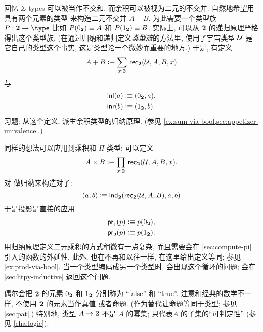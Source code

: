 回忆 $\Sigma$-types 可以被当作不交和, 而余积可以被视为二元的不交并.
自然地希望用具有两个元素的类型 \bool 来构造二元不交并 $A+B$.
为此需要一个类型族 $P:\bool\to\type$ 比如 $P({0_{\mathbf{2}}})\equiv A$ 和 $P({1_{\mathbf{2}}})\equiv B$.
实际上, 可以从 $\mathbf{2}$ 的递归原理严格得出这个类型族.
%
(在通过归纳和递归定义\emph{类型族}的方法里, 使用了宇宙类型 $\mathcal{U}$ 是它自己的类型这个事实, 这是类型论一个微妙而重要的地方.)
于是, 有定义
%
\[ A + B \defeq \sm{x:\bool} \rec{\bool}(\UU,A,B,x) \]
与
\begin{align*}
    {\mathsf{inl}}(a) &\vcentcolon\equiv ({0_{\mathbf{2}}},a), \\
    {\mathsf{inr}}(b) &\vcentcolon\equiv ({1_{\mathbf{2}}},b).
\end{align*}
习题: 从这个定义, 派生余积类型的归纳原理.
(参见 \cref{ex:sum-via-bool,sec:appetizer-univalence}.)

同样的想法可以应用到乘积和 $\Pi$-类型: 可以定义
\[ A \times B \defeq \prd{x:\bool}\rec{\bool}(\UU,A,B,x). \]
对 \bool 做归纳来构造对子:
\[ (a,b) \vcentcolon\equiv \mathsf{ind}_{\mathbf{2}}(\mathsf{rec}_{\mathbf{2}}(\mathcal{U},A,B),a,b) \]
于是投影是直接的应用
\begin{align*}
    \mathsf{pr}_{1}(p) &\vcentcolon\equiv p({0_{\mathbf{2}}}), \\
    \mathsf{pr}_{2}(p) &\vcentcolon\equiv p({1_{\mathbf{2}}}).
\end{align*}
用归纳原理定义二元乘积的方式稍微有一点复杂, 而且需要会在 \cref{sec:compute-pi} 引入的函数的外延性.
此外, 也在不再和以往一样, 在这里给出定义等同;
参见 \cref{ex:prod-via-bool}.
当一个类型编码成另一个类型时, 会出现这个循环的问题;
会在 \cref{sec:htpy-inductive} 返回这个问题.

偶尔会把 $\mathbf{2}$ 的元素 ${0_{\mathbf{2}}}$ 和 ${1_{\mathbf{2}}}$ 分别称为 ``false'' 和 ``true''.
注意和经典的数学不一样, 不使用 $\mathbf{2}$ 的元素当作真值%
%
或者命题.
(作为替代让命题等同于类型;
参见 \cref{sec:pat}.)
特别地, 类型 $A \to \mathbf{2}$ 不是 $A$ 的幂集; 只代表$A$ 的子集的``可判定性'' (参见 \cref{cha:logic}).
%

%